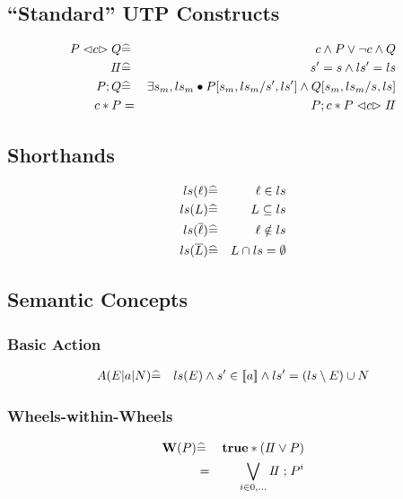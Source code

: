 \subsection{``Standard'' UTP Constructs}

\begin{eqnarray*}
   P \mathrel{\lhd{c}\rhd} Q
   &\widehat=&
   c \land P \lor \lnot c \land Q
\\ I\!I
   &\widehat=&
   s'= s \land ls'=ls
\\ P ; Q
   &\widehat=&
   \exists s_m,ls_m \bullet P[s_m,ls_m/s',ls'] \land Q[s_m,ls_m/s,ls]
\\ c * P
   &=&
   P ; c * P \mathrel{\lhd{c}\rhd} I\!I
\end{eqnarray*}

\subsection{Shorthands}

\begin{eqnarray*}
   ls(\ell) &\widehat=& \ell \in ls
\\ ls(L) &\widehat=& L \subseteq ls
\\ ls(\overline{\ell}) &\widehat=& \ell \notin ls
\\ ls(\overline{L}) &\widehat=& L \cap ls = \emptyset
\end{eqnarray*}

\subsection{Semantic Concepts}

\subsubsection{Basic Action}

\begin{eqnarray*}
   A(E|a|N)
   &\widehat=&
   ls(E) \land s' \in [\![{a}]\!] \land ls'=(ls\setminus E) \cup N
\end{eqnarray*}


\subsubsection{Wheels-within-Wheels}

\begin{eqnarray*}
   \mathbf{W}(P) &\widehat=& \mathbf{true} * (I\!I \lor P)
\\         &  =  & \bigvee_{i \in 0,\dots} I\!I \mathrel{;} P^i
\end{eqnarray*}


